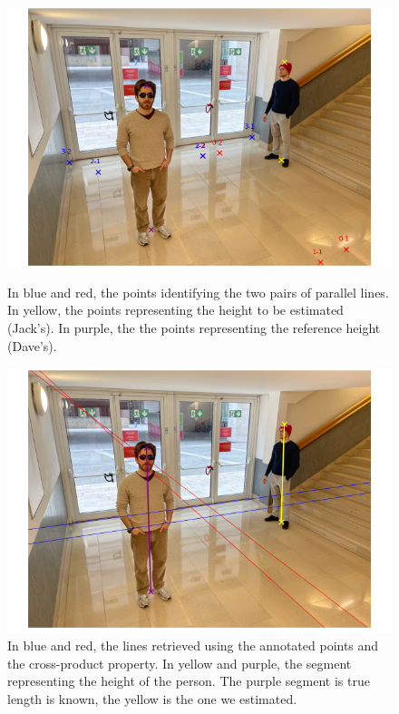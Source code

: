 \begin{figure}[htbp]
    \centering
    \begin{minipage}[t]{0.48\textwidth}
        \centering
        \includegraphics[width=\linewidth]{img/annotated_points.png}
        \vspace{-5pt}  %
        \caption{In blue and red, the points identifying the two pairs of parallel lines. In yellow, the points representing the height to be estimated (Jack's). In purple, the the points representing the reference height (Dave's).}
        \label{fig:annotated_points}
    \end{minipage}
    \hfill
    \begin{minipage}[t]{0.48\textwidth}
        \centering
        \includegraphics[width=\linewidth]{img/retrieved_lines.png}
        \vspace{-5pt}  %
        \caption{In blue and red, the lines retrieved using the annotated points and the cross-product property. In yellow and purple, the segment representing the height of the person. The purple segment is true length is known, the yellow is the one we estimated.}
        \label{fig:retrieved_lines}
    \end{minipage}
\end{figure}

